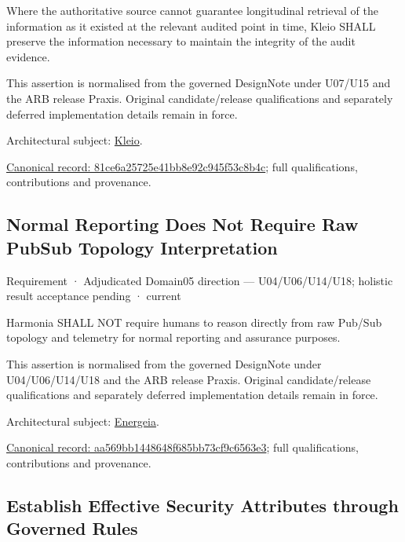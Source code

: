 Where the authoritative source cannot guarantee longitudinal retrieval of the information as it existed at the relevant audited point in time, Kleio SHALL preserve the information necessary to maintain the integrity of the audit evidence.



This assertion is normalised from the governed DesignNote under U07/U15 and the ARB release Praxis. Original candidate/release qualifications and separately deferred implementation details remain in force.



Architectural subject: \hyperref[element:fefda110e2274884ad58906733606efd]{Kleio}.


{\footnotesize \href{../../../../continuum/motivation/requirement/81ce6a25725e41bb8e92c945f53c8b4c.md}{Canonical record: 81ce6a25725e41bb8e92c945f53c8b4c}; full qualifications, contributions and provenance.}\par
\subsection{Normal Reporting Does Not Require Raw PubSub Topology Interpretation}

\label{element:aa569bb1448648f685bb73cf9c6563e3}
{\small Requirement · Adjudicated Domain05 direction — U04/U06/U14/U18; holistic result acceptance pending · current}\par

Harmonia SHALL NOT require humans to reason directly from raw Pub/Sub topology and telemetry for normal reporting and assurance purposes.



This assertion is normalised from the governed DesignNote under U04/U06/U14/U18 and the ARB release Praxis. Original candidate/release qualifications and separately deferred implementation details remain in force.



Architectural subject: \hyperref[element:fb3f37a6ac614415ac486a6de9d35994]{Energeia}.


{\footnotesize \href{../../../../continuum/motivation/requirement/aa569bb1448648f685bb73cf9c6563e3.md}{Canonical record: aa569bb1448648f685bb73cf9c6563e3}; full qualifications, contributions and provenance.}\par
\subsection{Establish Effective Security Attributes through Governed Rules}

